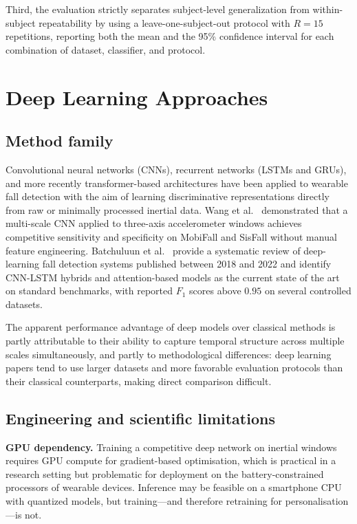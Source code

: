 Third, the evaluation strictly separates subject-level generalization from
within-subject repeatability by using a leave-one-subject-out protocol with
$R=15$ repetitions, reporting both the mean and the 95\% confidence interval
for each combination of dataset, classifier, and protocol.

\section{Deep Learning Approaches}
\label{subsec:rw-dl}

\subsection{Method family}

Convolutional neural networks (CNNs), recurrent networks (LSTMs and GRUs), and
more recently transformer-based architectures have been applied to wearable fall
detection with the aim of learning discriminative representations directly from
raw or minimally processed inertial data.  Wang et al.~\parencite{wang2020falldl}
demonstrated that a multi-scale CNN applied to three-axis accelerometer windows
achieves competitive sensitivity and specificity on MobiFall and SisFall without
manual feature engineering.  Batchuluun et al.~\parencite{batchuluun2022deep} provide
a systematic review of deep-learning fall detection systems published between 2018
and 2022 and identify CNN-LSTM hybrids and attention-based models as the current
state of the art on standard benchmarks, with reported $F_1$ scores above $0.95$
on several controlled datasets.

The apparent performance advantage of deep models over classical methods is partly
attributable to their ability to capture temporal structure across multiple scales
simultaneously, and partly to methodological differences: deep learning papers tend
to use larger datasets and more favorable evaluation protocols than their classical
counterparts, making direct comparison difficult.

\subsection{Engineering and scientific limitations}

\textbf{GPU dependency.}  Training a competitive deep network on inertial windows
requires GPU compute for gradient-based optimisation, which is practical in a
research setting but problematic for deployment on the battery-constrained processors
of wearable devices.  Inference may be feasible on a smartphone CPU with quantized
models, but training---and therefore retraining for personalisation---is not.

